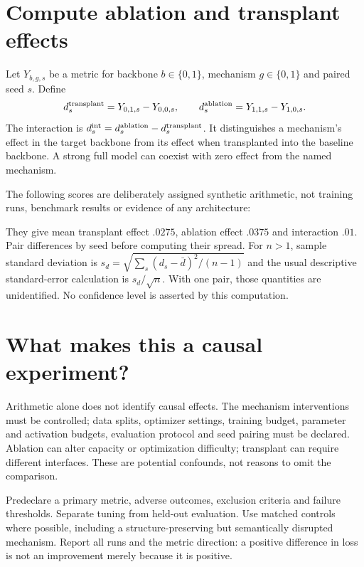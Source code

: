 \section{Compute ablation and transplant effects}
Let $Y_{b,g,s}$ be a metric for backbone $b\in\{0,1\}$, mechanism
$g\in\{0,1\}$ and paired seed $s$. Define
\[
 d^{\rm transplant}_s=Y_{0,1,s}-Y_{0,0,s},\qquad
 d^{\rm ablation}_s=Y_{1,1,s}-Y_{1,0,s}.
\]
The interaction is
$d^{\rm int}_s=d^{\rm ablation}_s-d^{\rm transplant}_s$.
It distinguishes a mechanism's effect in the target backbone from its effect
when transplanted into the baseline backbone. A strong full model can coexist
with zero effect from the named mechanism.
\par{}

The following scores are deliberately assigned synthetic arithmetic, not
training runs, benchmark results or evidence of any architecture:
\begin{center}\end{center}
They give mean transplant effect $.0275$, ablation effect $.0375$ and
interaction $.01$. Pair differences by seed before computing their spread.
For $n>1$, sample standard deviation is
$s_d=\sqrt{\sum_s(d_s-\bar d)^2/(n-1)}$ and the usual descriptive standard-error
calculation is $s_d/\sqrt n$. With one pair, those quantities are unidentified.
No confidence level is asserted by this computation.

\section{What makes this a causal experiment?}
Arithmetic alone does not identify causal effects. The mechanism interventions
must be controlled; data splits, optimizer settings, training budget, parameter
and activation budgets, evaluation protocol and seed pairing must be declared.
Ablation can alter capacity or optimization difficulty; transplant can require
different interfaces. These are potential confounds, not reasons to omit the
comparison.

Predeclare a primary metric, adverse outcomes, exclusion criteria and failure
thresholds. Separate tuning from held-out evaluation. Use matched controls
where possible, including a structure-preserving but semantically disrupted
mechanism. Report all runs and the metric direction: a positive difference in
loss is not an improvement merely because it is positive.

